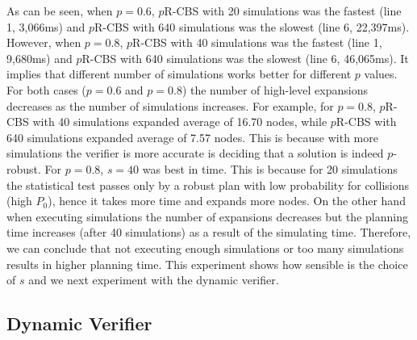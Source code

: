 \documentclass{article}
\newcommand{\prcbs}{$p$R-CBS\xspace}
\begin{document}
As can be seen, when $p=0.6$, \prcbs{} with 20 simulations was the fastest (line 1, 3,066ms) and  \prcbs{} with 640 simulations was the slowest (line 6, 22,397ms). However, when $p=0.8$, \prcbs{} with 40 simulations was the fastest (line 1, 9,680ms) and  \prcbs{} with 640 simulations was the slowest (line 6, 46,065ms). It implies that different number of simulations works better for different $p$ values. For both cases ($p=0.6$ and $p=0.8$) the number of high-level expansions decreases as the number of simulations increases. For example, for $p=0.8$, \prcbs{} with 40 simulations expanded average of 16.70 nodes, while \prcbs{} with 640 simulations expanded average of 7.57 nodes. This is because with more simulations the verifier is more accurate is deciding that a solution is indeed $p$-robust. For $p=0.8$, $s=40$ was best in time. This is because for 20 simulations the statistical test passes only by a robust plan with low probability for collisions (high $P_0$), hence it takes more time and expands more nodes. On the other hand when executing simulations the number of expansions decreases but the planning time increases (after 40 simulations) as a result of the simulating time. Therefore, we can conclude that not executing enough simulations or too many simulations results in higher planning time. This experiment shows how sensible is the choice of $s$ and we next experiment with the dynamic verifier.


\subsection{Dynamic Verifier}

\begin{table}[t]
\centering
{}
\caption{Success rate for \prcbs{} out of 60 instances.}
\label{tab:dynamic}
\end{table}
\end{document}
